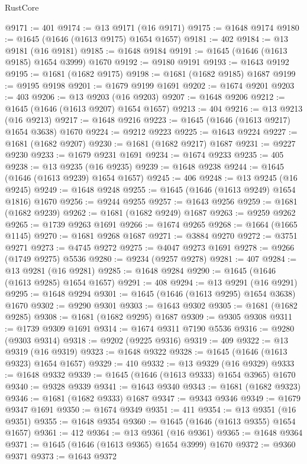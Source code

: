 \begin{lexlean}{RustCore}
\begin{coremodule}
@9171 := 401
@9174 := @13 @9171 (@16 @9171)
@9175 := @1648 @9174
@9180 := @1645 (@1646 (@1613 @9175) @1654 @1657)
@9181 := 402
@9184 := @13 @9181 (@16 @9181)
@9185 := @1648 @9184
@9191 := @1645 (@1646 (@1613 @9185) @1654 @3999) @1670
@9192 := @9180 @9191
@9193 := @1643 @9192
@9195 := @1681 (@1682 @9175)
@9198 := @1681 (@1682 @9185) @1687
@9199 := @9195 @9198
@9201 := @1679 @9199 @1691
@9202 := @1674 @9201
@9203 := 403
@9206 := @13 @9203 (@16 @9203)
@9207 := @1648 @9206
@9212 := @1645 (@1646 (@1613 @9207) @1654 @1657)
@9213 := 404
@9216 := @13 @9213 (@16 @9213)
@9217 := @1648 @9216
@9223 := @1645 (@1646 (@1613 @9217) @1654 @3638) @1670
@9224 := @9212 @9223
@9225 := @1643 @9224
@9227 := @1681 (@1682 @9207)
@9230 := @1681 (@1682 @9217) @1687
@9231 := @9227 @9230
@9233 := @1679 @9231 @1691
@9234 := @1674 @9233
@9235 := 405
@9238 := @13 @9235 (@16 @9235)
@9239 := @1648 @9238
@9244 := @1645 (@1646 (@1613 @9239) @1654 @1657)
@9245 := 406
@9248 := @13 @9245 (@16 @9245)
@9249 := @1648 @9248
@9255 := @1645 (@1646 (@1613 @9249) @1654 @1816) @1670
@9256 := @9244 @9255
@9257 := @1643 @9256
@9259 := @1681 (@1682 @9239)
@9262 := @1681 (@1682 @9249) @1687
@9263 := @9259 @9262
@9265 := @1739 @9263 @1691
@9266 := @1674 @9265
@9268 := @1664 (@1665 @1145)
@9270 := @1681 @9268 @1687
@9271 := @3884 @9270
@9272 := @3751 @9271
@9273 := @4745 @9272
@9275 := @4047 @9273 @1691
@9278 := @9266 (@1749 @9275) @5536
@9280 := @9234 (@9257 @9278)
@9281 := 407
@9284 := @13 @9281 (@16 @9281)
@9285 := @1648 @9284
@9290 := @1645 (@1646 (@1613 @9285) @1654 @1657)
@9291 := 408
@9294 := @13 @9291 (@16 @9291)
@9295 := @1648 @9294
@9301 := @1645 (@1646 (@1613 @9295) @1654 @3638) @1670
@9302 := @9290 @9301
@9303 := @1643 @9302
@9305 := @1681 (@1682 @9285)
@9308 := @1681 (@1682 @9295) @1687
@9309 := @9305 @9308
@9311 := @1739 @9309 @1691
@9314 := @1674 @9311 @7190 @5536
@9316 := @9280 (@9303 @9314)
@9318 := @9202 (@9225 @9316)
@9319 := 409
@9322 := @13 @9319 (@16 @9319)
@9323 := @1648 @9322
@9328 := @1645 (@1646 (@1613 @9323) @1654 @1657)
@9329 := 410
@9332 := @13 @9329 (@16 @9329)
@9333 := @1648 @9332
@9339 := @1645 (@1646 (@1613 @9333) @1654 @3965) @1670
@9340 := @9328 @9339
@9341 := @1643 @9340
@9343 := @1681 (@1682 @9323)
@9346 := @1681 (@1682 @9333) @1687
@9347 := @9343 @9346
@9349 := @1679 @9347 @1691
@9350 := @1674 @9349
@9351 := 411
@9354 := @13 @9351 (@16 @9351)
@9355 := @1648 @9354
@9360 := @1645 (@1646 (@1613 @9355) @1654 @1657)
@9361 := 412
@9364 := @13 @9361 (@16 @9361)
@9365 := @1648 @9364
@9371 := @1645 (@1646 (@1613 @9365) @1654 @3999) @1670
@9372 := @9360 @9371
@9373 := @1643 @9372

\end{coremodule}
\end{lexlean}
